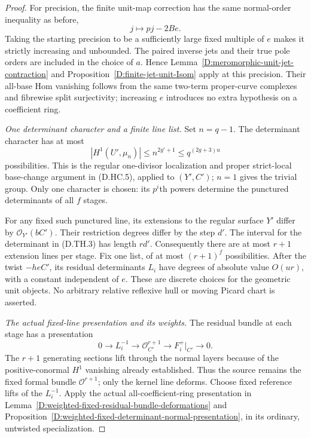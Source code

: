 \begin{proof}
For precision, the finite unit-map correction has the same
normal-order inequality as before,
\[
                    j\longmapsto pj-2Be.              \tag{D.TH.5}
\]
Taking the starting precision to be a sufficiently large
fixed multiple of $e$ makes it strictly increasing and
unbounded. The paired inverse jets and their true pole
orders are included in the choice of $a$. Hence
Lemma~\ref{D:meromorphic-unit-jet-contraction} and
Proposition~\ref{D:finite-jet-unit-Isom} apply at this
precision. Their all-base Hom vanishing follows from the
same two-term proper-curve complexes and fibrewise split
surjectivity; increasing $e$ introduces no extra hypothesis
on a coefficient ring.

\emph{One determinant character and a finite line list.}
Set $n=q-1$. The determinant character has at most
\[
 |H^1(U',\mu_n)|\leq n^{2g'+1}
                         \leq q^{(2g+3)u}             \tag{D.TH.6}
\]
possibilities. This is the regular one-divisor localization
and proper strict-local base-change argument in (D.HC.5),
applied to $(Y',C')$; $n=1$ gives the trivial group.
Only one character is chosen: its $p^i$th powers determine
the punctured determinants of all $f$ stages.

For any fixed such punctured line, its extensions to the
regular surface $Y'$ differ by $\mathcal O_{Y'}(bC')$.
Their restriction degrees differ by the step $d'$. The
interval for the determinant in (D.TH.3) has length $rd'$.
Consequently there are at most $r+1$ extension lines per
stage. Fix one list, of at most $(r+1)^f$ possibilities.
After the twist $-heC'$, its residual determinants $L_i$
have degrees of absolute value $O(ur)$, with a constant
independent of $e$. These are discrete choices for the
geometric unit objects. No arbitrary relative reflexive
hull or moving Picard chart is asserted.

\emph{The actual fixed-line presentation and its weights.}
The residual bundle at each stage has a presentation
\[
 0\longrightarrow L_i^{-1}\longrightarrow
       \mathcal O_{C'}^{r+1}\longrightarrow F_i^+|_{C'}
       \longrightarrow0.                              \tag{D.TH.7}
\]
The $r+1$ generating sections lift through the normal
layers because of the positive-conormal $H^1$ vanishing
already established. Thus the source remains the fixed
formal bundle $\mathcal O^{r+1}$; only the kernel line
deforms. Choose fixed reference lifts of the $L_i^{-1}$.
Apply the actual all-coefficient-ring presentation in
Lemma~\ref{D:weighted-fixed-residual-bundle-deformations}
and Proposition~\ref{D:weighted-fixed-determinant-normal-presentation},
in its ordinary, untwisted specialization.


\end{proof}
